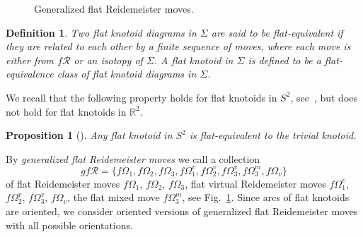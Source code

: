 \documentclass[11pt]{amsart}
\theoremstyle{noparens}
\newtheorem{proposition}{Proposition}[section]
\newtheorem{definition}{Definition}[section]
\numberwithin{equation}{section}
\numberwithin{equation}{section}
\begin{document}
\begin{figure}[htbp]
\begin{center}
\caption{Generalized flat Reidemeister moves.} \label{fig7}	
\end{center}
\end{figure}

\begin{definition} {\rm 
Two flat knotoid diagrams in $\Sigma$ are said to be \textit{flat-equivalent} if they are related to each other by a finite sequence of moves, where each move is either from $\textit{f}\mathcal{R}$ or an  isotopy of $\Sigma$. A \textit{flat knotoid in $\Sigma$} is defined to be a flat-equivalence class of flat knotoid diagrams in $\Sigma$. 
}
\end{definition}

We recall that the following property holds for flat knotoids in $S^2$, see~\cite[Prop.~3.6]{GK}, but does not hold for flat knotoids in $\mathbb R^2$. 

\begin{proposition} [\cite{GK}] \label{prop2}
Any flat knotoid in $S^2$ is flat-equivalent to the trivial knotoid.
\end{proposition}

By \textit{generalized flat Reidemeister moves} we call a collection 
$$
\textit{gf}\mathcal{R} = \{f\Omega_1, f\Omega_2, f\Omega_3, f\Omega_1^v, f\Omega_2^v, f\Omega_3^v, f\Omega_3^m, f\Omega_v\}
$$ 
of flat Reidemeister moves $f\Omega_1$, $f\Omega_2$, $f\Omega_3$, flat virtual Reidemeister moves $f\Omega_1^v$, $f\Omega_2^v$, $f\Omega_3^v$, $f\Omega_v$, the flat mixed move $f\Omega_3^m$, see Fig.~\ref{fig7}. Since arcs of flat knotoids are oriented, we consider oriented versions of generalized flat Reidemeister moves with all possible orientations.  
\end{document}

